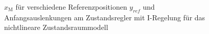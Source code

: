 \begin{figure}[H]
    \centering
    \caption[$x_{\mathrm{M}}$ für Regler mit I-Regelung (nichtlinear)]{$x_{\mathrm{M}}$ für verschiedene Referenzpositionen $y_{ref}$ und Anfangsauslenkungen am Zustandsregler mit I-Regelung für das nichtlineare Zustandsraummodell}
    \label{fig:Bild38}
\end{figure}


